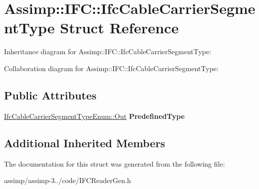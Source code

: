 \hypertarget{struct_assimp_1_1_i_f_c_1_1_ifc_cable_carrier_segment_type}{\section{Assimp\+:\+:I\+F\+C\+:\+:Ifc\+Cable\+Carrier\+Segment\+Type Struct Reference}
\label{struct_assimp_1_1_i_f_c_1_1_ifc_cable_carrier_segment_type}
}


Inheritance diagram for Assimp\+:\+:I\+F\+C\+:\+:Ifc\+Cable\+Carrier\+Segment\+Type\+:


Collaboration diagram for Assimp\+:\+:I\+F\+C\+:\+:Ifc\+Cable\+Carrier\+Segment\+Type\+:
\subsection*{Public Attributes}
\begin{DoxyCompactItemize}
\item 
\hypertarget{struct_assimp_1_1_i_f_c_1_1_ifc_cable_carrier_segment_type_aff22ff158d0cdc9a6a50e0fa36a7b2fa}{\hyperlink{classboost_1_1shared__ptr}{Ifc\+Cable\+Carrier\+Segment\+Type\+Enum\+::\+Out} {\bfseries Predefined\+Type}}\label{struct_assimp_1_1_i_f_c_1_1_ifc_cable_carrier_segment_type_aff22ff158d0cdc9a6a50e0fa36a7b2fa}

\end{DoxyCompactItemize}
\subsection*{Additional Inherited Members}


The documentation for this struct was generated from the following file\+:\begin{DoxyCompactItemize}
\item 
assimp/assimp-\/3../code/I\+F\+C\+Reader\+Gen.\+h\end{DoxyCompactItemize}
